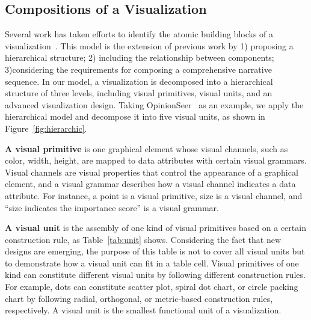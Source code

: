 \subsection{Compositions of a Visualization}\label{compositions}
Several work has taken efforts to identify the atomic building blocks of a visualization~\cite{mendez_ivolver:_2016, bertin1983semiology}. 
This model is the extension of previous work by 1) proposing a hierarchical structure; 2) including the relationship between components; 3)considering the requirements for composing a comprehensive narrative sequence. 
In our model, a visualization is decomposed into a hierarchical structure of three levels, including
visual primitives, visual units, and an advanced visualization design. 
Taking OpinionSeer~\cite{wu_opinionseer:_2010} as an example, we apply the hierarchical model and decompose it into five visual units, as shown in Figure~\ref{fig:hierarchic}. 

\textbf{A visual primitive} is one graphical element whose visual channels, such as color, width, height, are mapped to data attributes with certain visual grammars. Visual channels are visual properties that control the appearance of a graphical element, and a visual grammar describes how a visual channel indicates a data attribute. For instance, a point is a visual primitive, size is a visual channel, and ``size indicates the importance score'' is a visual grammar. 

\textbf{A visual unit} is the assembly of one kind of visual primitives based on a certain construction rule, as Table~\ref{tab:unit} shows. Considering the fact that new designs are emerging, the purpose of this table is not to cover all visual units but to demonstrate how a visual unit can fit in a table cell.
Visual primitives of one kind can constitute different visual units by following different construction rules. For example, dots can constitute scatter plot, spiral dot chart, or circle packing chart by following radial, orthogonal, or metric-based construction rules, respectively. 
A visual unit is the smallest functional unit of a visualization. 

